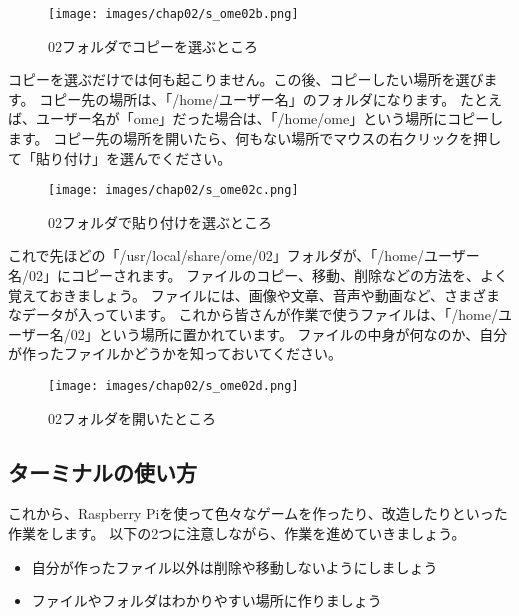 \begin{figure}[H]
  \begin{center}
    \texttt{[image: images/chap02/s\_ome02b.png]}
    \caption{02フォルダでコピーを選ぶところ}
  \end{center}
  \label{fig:folder_02copy}
\end{figure}

\noindent
コピーを選ぶだけでは何も起こりません。この後、コピーしたい場所を選びます。
コピー先の場所は、「/home/ユーザー名」のフォルダになります。
たとえば、ユーザー名が「ome」だった場合は、「/home/ome」という場所にコピーします。
コピー先の場所を開いたら、何もない場所でマウスの右クリックを押して「貼り付け」を選んでください。

\begin{figure}[H]
  \begin{center}
    \texttt{[image: images/chap02/s\_ome02c.png]}
    \caption{02フォルダで貼り付けを選ぶところ}
  \end{center}
  \label{fig:folder_02paste}
\end{figure}

\noindent
これで先ほどの「/usr/local/share/ome/02」フォルダが、「/home/ユーザー名/02」にコピーされます。
ファイルのコピー、移動、削除などの方法を、よく覚えておきましょう。
ファイルには、画像や文章、音声や動画など、さまざまなデータが入っています。
これから皆さんが作業で使うファイルは、「/home/ユーザー名/02」という場所に置かれています。
ファイルの中身が何なのか、自分が作ったファイルかどうかを知っておいてください。

\begin{figure}[H]
  \begin{center}
    \texttt{[image: images/chap02/s\_ome02d.png]}
    \caption{02フォルダを開いたところ}
  \end{center}
  \label{fig:folder_02open}
\end{figure}
\clearpage


\subsection{ターミナルの使い方}
これから、Raspberry Piを使って色々なゲームを作ったり、改造したりといった作業をします。
以下の2つに注意しながら、作業を進めていきましょう。

\begin{itemize}
  \item 自分が作ったファイル以外は削除や移動しないようにしましょう
  \item ファイルやフォルダはわかりやすい場所に作りましょう
\end{itemize}

